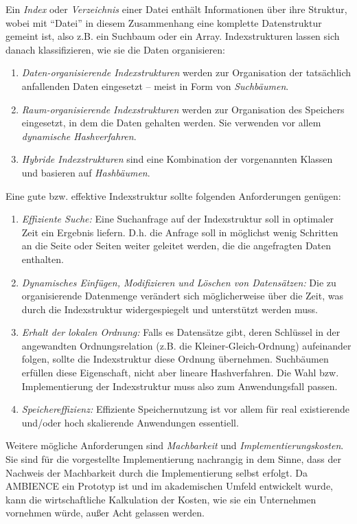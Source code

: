 Ein \textit{Index} oder \textit{Verzeichnis} einer Datei enthält Informationen über ihre Struktur, wobei mit "`Datei"' in diesem Zusammenhang eine komplette Datenstruktur gemeint ist, also z.B. ein Suchbaum oder ein Array. Indexstrukturen lassen sich danach klassifizieren, wie sie die Daten organisieren: 
\enlargethispage{\baselineskip}
\begin{enumerate}
	\item \textit{Daten-organisierende Indexstrukturen} werden zur Organisation der tatsächlich anfallenden Daten eingesetzt -- meist in Form von \textit{Suchbäumen}. 
	\item \textit{Raum-organisierende Indexstrukturen} werden zur Organisation des Speichers eingesetzt, in dem die Daten gehalten werden. Sie verwenden vor allem \textit{dynamische Hashverfahren}. 
	\item \textit{Hybride Indexstrukturen} sind eine Kombination der vorgenannten Klassen und basieren auf \textit{Hashbäumen}.   
\end{enumerate}
Eine gute bzw. effektive Indexstruktur sollte folgenden Anforderungen genügen: 
\begin{enumerate}
	\item \textit{Effiziente Suche:} Eine Suchanfrage auf der Indexstruktur soll in optimaler Zeit ein Ergebnis liefern. D.h. die Anfrage soll in möglichst wenig Schritten an die Seite oder Seiten weiter geleitet werden, die die angefragten Daten enthalten.
	\item \textit{Dynamisches Einfügen, Modifizieren und Löschen von Datensätzen:} Die zu organisierende Datenmenge verändert sich möglicherweise über die Zeit, was durch die Indexstruktur widergespiegelt und unterstützt werden muss.  
	\item \textit{Erhalt der lokalen Ordnung:} Falls es Datensätze gibt, deren Schlüssel in der angewandten Ordnungsrelation (z.B. die Kleiner-Gleich-Ordnung) aufeinander folgen, sollte die Indexstruktur diese Ordnung übernehmen. Suchbäumen erfüllen diese Eigenschaft, nicht aber lineare Hashverfahren. Die Wahl bzw. Implementierung der Indexstruktur muss also zum Anwendungsfall passen. 
	\item \textit{Speichereffizienz:} Effiziente Speichernutzung ist vor allem für real existierende und/oder hoch skalierende Anwendungen essentiell. 
\end{enumerate}
Weitere mögliche Anforderungen sind \textit{Machbarkeit} und \textit{Implementierungskosten}. Sie sind für die vorgestellte Implementierung nachrangig in dem Sinne, dass der Nachweis der Machbarkeit durch die Implementierung selbst erfolgt. Da AMBIENCE ein Prototyp ist und im akademischen Umfeld entwickelt wurde, kann die wirtschaftliche Kalkulation der Kosten, wie sie ein Unternehmen vornehmen würde, außer Acht gelassen werden. 

